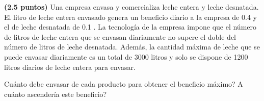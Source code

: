 
\textbf{(2.5 puntos)} Una empresa envasa y comercializa leche entera y leche desnatada. El litro de leche entera envasado genera un beneficio diario a la empresa de 0.4 \texteuro{} y el de leche desnatada de 0.1 \texteuro{}. La tecnología de la empresa impone que el número de litros de leche entera que se envasan diariamente no supere el doble del número de litros de leche desnatada. Además, la cantidad máxima de leche que se puede envasar diariamente es un total de 3000 litros y solo se dispone de 1200 litros diarios de leche entera para envasar.

\textquestiondown{}Cuánto debe envasar de cada producto para obtener el beneficio máximo? \textquestiondown{}A cuánto ascendería este beneficio?
